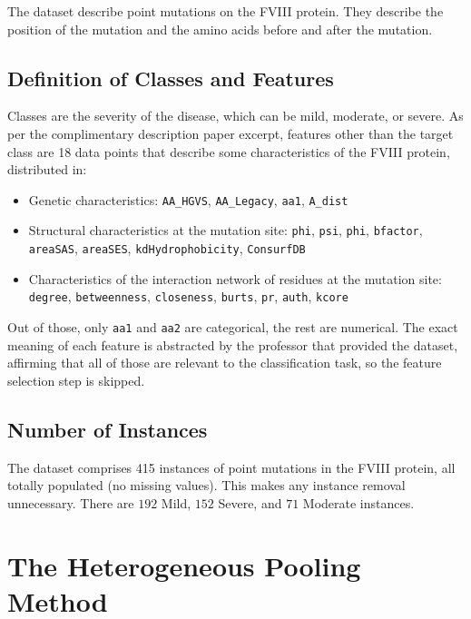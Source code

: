 \documentclass[review]{elsarticle}
\let\mono\texttt%
\begin{document}
The dataset describe point mutations on the FVIII protein. They describe the position of the mutation and the amino acids before and after the mutation.

\subsection{Definition of Classes and Features}

Classes are the severity of the disease, which can be mild, moderate, or severe. As per the complimentary description paper excerpt\cite{paperexcerpt}, features other than the target class are 18 data points that describe some characteristics of the FVIII protein, distributed in:
\begin{itemize}
    \item Genetic characteristics: \mono{AA\_HGVS}, \mono{AA\_Legacy}, \mono{aa1}, \mono{A\_dist}

    \item Structural characteristics at the mutation site: \mono{phi}, \mono{psi}, \mono{phi}, \mono{bfactor}, \mono{areaSAS}, \mono{areaSES}, \mono{kdHydrophobicity}, \mono{ConsurfDB}

    \item Characteristics of the interaction network of residues at the mutation site: \mono{degree}, \mono{betweenness}, \mono{closeness}, \mono{burts}, \mono{pr}, \mono{auth}, \mono{kcore}
\end{itemize}

Out of those, only \mono{aa1} and \mono{aa2} are categorical, the rest are numerical.
The exact meaning of each feature is abstracted by the professor that provided the dataset, affirming that all of those are relevant to the classification task, so the feature selection step is skipped.

\subsection{Number of Instances} \label{instances}

The dataset comprises 415 instances of point mutations in the FVIII protein, all totally populated (no missing values). This makes any instance removal unnecessary. There are $192$ Mild, $152$ Severe, and $71$ Moderate instances.

\section{The Heterogeneous Pooling Method}
\end{document}
